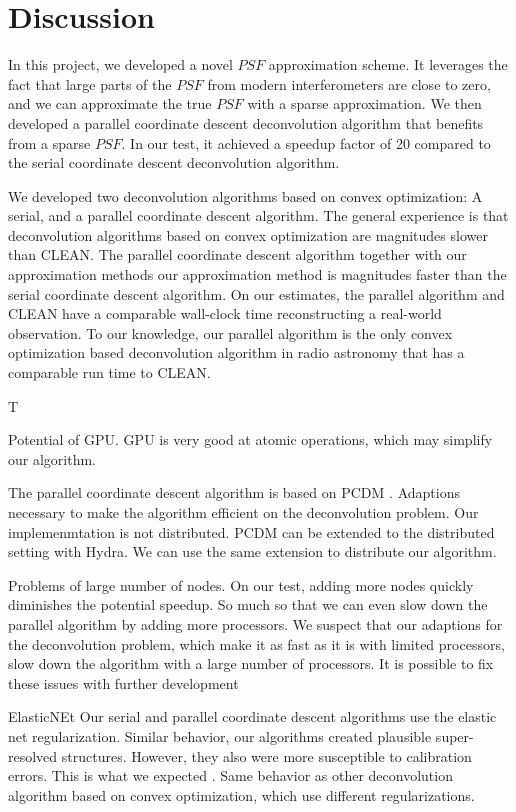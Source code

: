 \section{Discussion}\label{discussion}
In this project, we developed a novel $PSF$ approximation scheme. It leverages the fact that large parts of the $PSF$ from modern interferometers are close to zero, and we can approximate the true $PSF$ with a sparse approximation. We then developed a parallel coordinate descent deconvolution algorithm that benefits from a sparse $PSF$. In our test, it achieved a speedup factor of 20 compared to the serial coordinate descent deconvolution algorithm.

We developed two deconvolution algorithms based on convex optimization: A serial, and a parallel coordinate descent algorithm. The general experience is that deconvolution algorithms based on convex optimization are magnitudes slower than CLEAN\cite{offringa2017optimized}. The parallel coordinate descent algorithm together with our approximation methods our approximation method is magnitudes faster than the serial coordinate descent algorithm. On our estimates, the parallel algorithm and CLEAN have a comparable wall-clock time reconstructing a real-world observation. To our knowledge, our parallel algorithm is the only convex optimization based deconvolution algorithm in radio astronomy that has a comparable run time to CLEAN.

T

Potential of GPU. GPU is very good at atomic operations, which may simplify our algorithm.

The parallel coordinate descent algorithm is based on PCDM \cite{richtarik2016parallel}. Adaptions necessary to make the algorithm efficient on the deconvolution problem. Our implemenmtation is not distributed. PCDM can be extended to the distributed setting with Hydra. We can use the same extension to distribute our algorithm.

Problems of large number of nodes. On our test, adding more nodes quickly diminishes the potential speedup. So much so that we can even slow down the parallel algorithm by adding more processors. 
We suspect that our adaptions for the deconvolution problem, which make it as fast as it is with limited processors, slow down the algorithm with a large number of processors.
It is possible to fix these issues with further development


ElasticNEt
Our serial and parallel coordinate descent algorithms use the elastic net regularization.
Similar behavior, our algorithms created plausible super-resolved structures. However, they also were more susceptible to calibration errors.
This is what we expected \cite{offringa2017optimized}. Same behavior as other deconvolution algorithm based on convex optimization, which use different regularizations.

